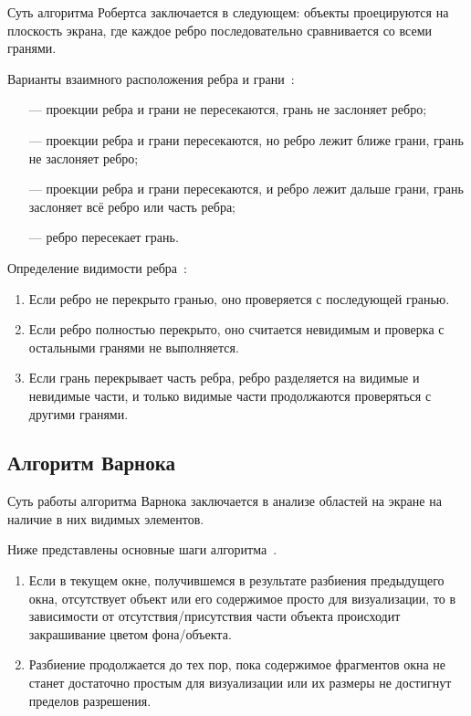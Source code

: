 Суть алгоритма Робертса заключается в следующем: объекты проецируются на плоскость экрана, где каждое ребро последовательно сравнивается со всеми гранями. 

Варианты взаимного расположения ребра и грани~\cite{rodjers}:
\begin{itemize}
	\item[---] проекции ребра и грани не пересекаются, грань не заслоняет ребро;
	\item[---] проекции ребра и грани пересекаются, но ребро лежит ближе грани, грань не заслоняет ребро;
	\item[---] проекции ребра и грани пересекаются, и ребро лежит дальше грани, грань заслоняет всё ребро или часть ребра;
	\item[---] ребро пересекает грань. 
\end{itemize}

Определение видимости ребра~\cite{rodjers}:
\begin{enumerate}
	\item Если ребро не перекрыто гранью, оно проверяется с последующей гранью.
	\item Если ребро полностью перекрыто, оно считается невидимым и проверка с остальными гранями не выполняется.
	\item Если грань перекрывает часть ребра, ребро разделяется на видимые и невидимые части, и только видимые части продолжаются проверяться с другими гранями.
\end{enumerate}

\subsection{Алгоритм Варнока}

Суть работы алгоритма Варнока заключается в анализе областей на экране на наличие в них видимых элементов.

Ниже представлены основные шаги алгоритма~\cite{varnok}.
\begin{enumerate} 
	\item Если в текущем окне, получившемся в результате разбиения предыдущего окна, отсутствует объект или его содержимое просто для визуализации, то в зависимости от отсутствия/присутствия части объекта происходит закрашивание цветом фона/объекта.
	\item Разбиение продолжается до тех пор, пока содержимое фрагментов окна не станет достаточно простым для визуализации или их размеры не достигнут пределов разрешения.
\end{enumerate}


